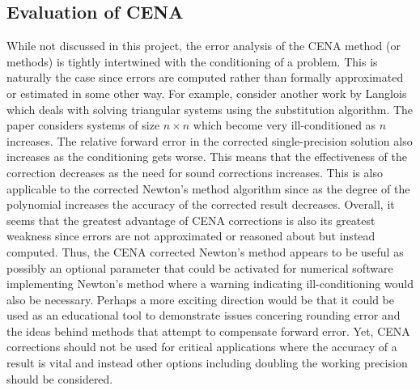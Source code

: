 \documentclass{standalone}
\begin{document}
	\subsection{Evaluation of CENA}
	While not discussed in this project, the error analysis of the CENA method (or methods) is tightly intertwined with the conditioning of a problem. \cite{langlois2001automatic} \cite{langlois2004more} This is naturally the case since errors are computed rather than formally approximated or estimated in some other way. For example, consider another work by Langlois which deals with solving triangular systems using the substitution algorithm. \cite{langlois2005solving} The paper considers systems of size $n\times n$ which become very ill-conditioned as $n$ increases. The relative forward error in the corrected single-precision solution also increases as the conditioning gets worse. This means that the effectiveness of the correction decreases as the need for sound corrections increases. This is also applicable to the corrected Newton's method algorithm since as the degree of the polynomial increases the accuracy of the corrected result decreases. Overall, it seems that the greatest advantage of CENA corrections is also its greatest weakness since errors are not approximated or reasoned about but instead computed. Thus, the CENA corrected Newton's method appears to be useful as possibly an optional parameter that could be activated for numerical software implementing Newton's method where a warning indicating ill-conditioning would also be necessary. Perhaps a more exciting direction would be that it could be used as an educational tool to demonstrate issues concering rounding error and the ideas behind methods that attempt to compensate forward error. Yet, CENA corrections should not be used for critical applications where the accuracy of a result is vital and instead other options including doubling the working precision should be considered.
\end{document}
